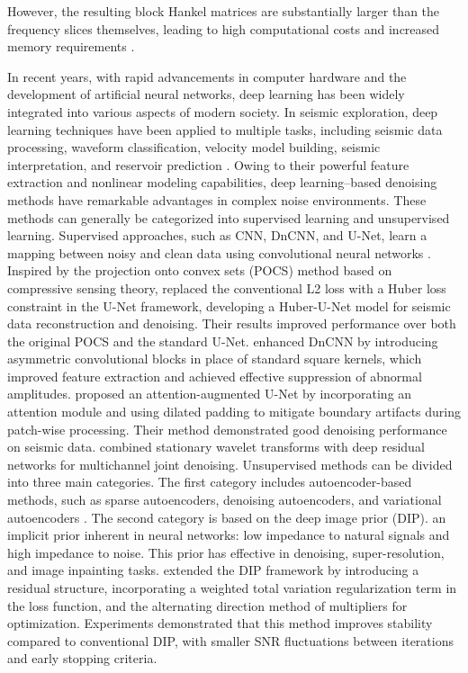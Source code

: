 \documentclass[preprint,12pt,authoryear]{elsarticle}
\begin{document}
However, the resulting block Hankel matrices are substantially larger than the frequency slices themselves, leading to high computational costs and increased memory requirements \citep{cui2023deeplearning}.
 
In recent years, with  rapid advancements in computer hardware and the development of artificial neural networks, deep learning has been widely integrated into various aspects of modern society. In seismic exploration, deep learning techniques have been applied to multiple tasks, including seismic data processing, waveform classification, velocity model building, seismic interpretation, and reservoir prediction \citep{zhang2024gan}. Owing to their powerful feature extraction and nonlinear modeling capabilities, deep learning--based denoising methods have  remarkable advantages in complex noise environments. These methods can generally be categorized into supervised learning and unsupervised learning. Supervised approaches, such as CNN, DnCNN, and U-Net, learn a mapping between noisy and clean data using convolutional neural networks \citep{yu2019deeplearning, zhang2017residualcnn, chai2021deep}. Inspired by the projection onto convex sets (POCS) method based on compressive sensing theory, \citet{ou2023hubernet} replaced the conventional L2 loss with a Huber loss constraint in the U-Net framework, developing a Huber-U-Net model for seismic data reconstruction and denoising. Their results  improved performance over both the original POCS and the standard U-Net. \citet{fan2023dcnn} enhanced DnCNN by introducing asymmetric convolutional blocks in place of standard square kernels, which improved feature extraction and achieved effective suppression of abnormal amplitudes. \citet{cao2024attentionunet} proposed an attention-augmented U-Net by incorporating an attention module  and using dilated padding to mitigate boundary artifacts during patch-wise processing. Their method demonstrated good denoising performance on seismic data. \citet{wu2022waveletresidual} combined stationary wavelet transforms with deep residual networks for multichannel joint denoising. Unsupervised methods can be divided into three main categories. The first category includes autoencoder-based methods, such as sparse autoencoders, denoising autoencoders, and variational autoencoders  \citep{vincent2010stacked}. The second category is based on the deep image prior (DIP). \citet{lempitsky2018deep}  an implicit prior inherent in neural networks: low impedance to natural signals and high impedance to noise. This prior has  effective in denoising, super-resolution, and image inpainting tasks. \citet{wang2023wtvadmm} extended the DIP framework by introducing a residual structure, incorporating a weighted total variation  regularization term in the loss function, and  the alternating direction method of multipliers  for optimization. Experiments demonstrated that this method improves stability compared to conventional DIP, with smaller SNR fluctuations between iterations and  early stopping criteria.
\end{document}
